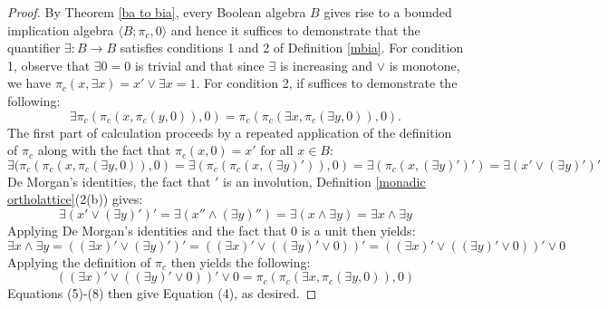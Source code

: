 \documentclass[10pt,a4paper]{amsart}
\begin{document}
\begin{proof}
    By Theorem \ref{ba to bia}, every Boolean algebra $B$ gives rise to a bounded implication algebra $\langle B;\pi_c,0\rangle$ and hence it suffices to demonstrate that the quantifier $\exists\colon B\to B$ satisfies conditions 1 and 2 of Definition \ref{mbia}. For condition 1, observe that $\exists 0=0$ is trivial and that since $\exists$ is increasing and $\vee$ is monotone, we have $\pi_c(x,\exists x)=x'\vee\exists x=1$. For condition 2, if suffices to demonstrate the following: 
    \begin{equation}
\exists\pi_c(\pi_c(x,\pi_c(y,0)),0)=\pi_c(\pi_c(\exists x,\pi_c(\exists y,0)),0).
    \end{equation}
    The first part of calculation proceeds by a repeated application of the definition of $\pi_c$ along with the fact that $\pi_c(x,0)=x'$ for all $x\in B$:
    \begin{equation}
        \exists(\pi_c(\pi_c(x,\pi_c(\exists y,0)),0)=\exists(\pi_c(\pi_c(x,(\exists y)')),0)=\exists(\pi_c(x,(\exists y)')')=\exists(x'\vee(\exists y)')'
    \end{equation}
    De Morgan's identities, the fact that $'$ is an involution, Definition \ref{monadic ortholattice}(2(b)) gives:
    \begin{equation}
        \exists(x'\vee(\exists y)')'=\exists(x''\wedge(\exists y)'')=\exists(x\wedge\exists y)=\exists x\wedge \exists y
    \end{equation}
Applying De Morgan's identities and the fact that $0$ is a unit then yields: 
\begin{equation}
     \exists x\wedge \exists y=((\exists x)'\vee (\exists y)')'=((\exists x)'\vee((\exists y)'\vee 0))'=((\exists x)'\vee((\exists y)'\vee 0))'\vee 0
\end{equation}
Applying the definition of $\pi_c$ then yields the following: 
\begin{equation}
    ((\exists x)'\vee((\exists y)'\vee 0))'\vee 0=\pi_c(\pi_c(\exists x,\pi_c(\exists y,0)),0)
\end{equation}
Equations (5)-(8) then give Equation (4), as desired.    
\end{proof}
\end{document}
